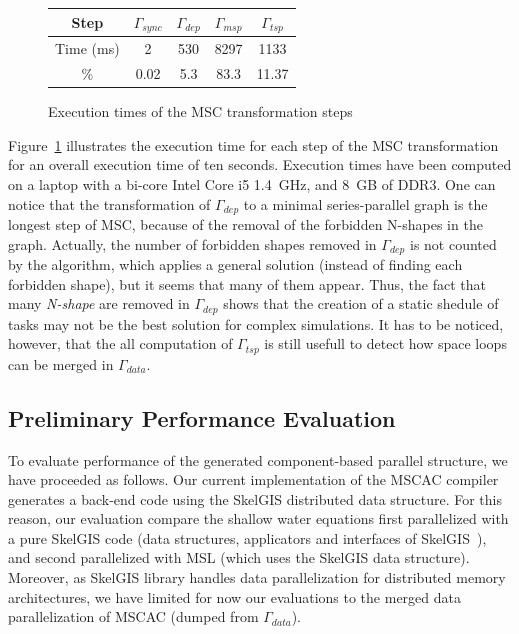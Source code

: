 \begin{figure}[!h]
 \begin{center}
 \begin{tabular}{|c|c|c|c|c|}
  \hline
   Step & $\Gamma_{sync}$ & $\Gamma_{dep}$ & $\Gamma_{msp}$ & $\Gamma_{tsp}$\\
   \hline
   Time (ms) & 2 & 530 & 8297 & 1133\\
   \hline
   \% & 0.02 & 5.3 & 83.3 & 11.37\\
   \hline
 \end{tabular}
\caption{Execution times of the MSC transformation steps}
\label{fig:exectime}
 \end{center}
\end{figure}

Figure~\ref{fig:exectime} illustrates the execution time for each step of the MSC transformation for an overall execution time of ten seconds. Execution times have been computed on a laptop with a bi-core Intel Core i5 1.4~GHz, and 8~GB of DDR3. 
One can notice that the transformation of $\Gamma_{dep}$ to a minimal series-parallel graph is the longest step of MSC, because of the removal of the forbidden N-shapes in the graph. Actually, the number of forbidden shapes removed in $\Gamma_{dep}$ is not counted by the algorithm, which applies a general solution (instead of finding each forbidden shape), but it seems that many of them appear.
Thus, the fact that many \emph{N-shape} are removed in $\Gamma_{dep}$ shows that the creation of a static shedule of tasks may not be the best solution for complex simulations. It has to be noticed, however, that the all computation of $\Gamma_{tsp}$ is still usefull to detect how space loops can be merged in $\Gamma_{data}$.

\subsection{Preliminary Performance Evaluation}
To evaluate performance of the generated component-based parallel structure, we have proceeded as follows. Our current implementation of the MSCAC compiler generates a back-end code using the SkelGIS distributed data structure. For this reason, our evaluation compare the shallow water equations first parallelized with a pure SkelGIS code (data structures, applicators and interfaces of SkelGIS~\cite{CPE:CPE3494}), and second parallelized with MSL (which uses the SkelGIS data structure). Moreover, as SkelGIS library handles data parallelization for distributed memory architectures, we have limited for now our evaluations to the merged data parallelization of MSCAC (dumped from $\Gamma_{data}$). 


